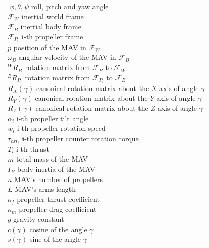 \begin{tabbing}
 \hspace*{1.6cm} \= \kill
  $\phi, \theta, \psi$    \> roll, pitch and yaw angle \\[0.5ex]
  $\mathcal{F}_{W}$   \> inertial world frame \\[0.5ex]
  $\mathcal{F}_{B}$   \> inertial body frame \\[0.5ex]
  $\mathcal{F}_{P_{i}}$   \> i-th propeller frame \\[0.5ex]
  $p$   \> position of the MAV in $\mathcal{F}_{W}$ \\[0.5ex]
  $\omega_{B}$    \> angular velocity of the MAV in $\mathcal{F}_{B}$\\[0.5ex]
  $^{W}R_{B}$   \> rotation matrix from $\mathcal{F}_{B}$ to $\mathcal{F}_{W}$\\[0.5ex]
  $^{B}R_{P_{i}}$  \> rotation matrix from $\mathcal{F}_{P_{i}}$ to $\mathcal{F}_{B}$\\[0.5ex]
  $R_{X}(\gamma)$   \> canonical rotation matrix about the $X$ axis of angle $\gamma$\\[0.5ex]
  $R_{Y}(\gamma)$   \> canonical rotation matrix about the $Y$ axis of angle $\gamma$\\[0.5ex]
  $R_{Z}(\gamma)$   \> canonical rotation matrix about the $Z$ axis of angle $\gamma$\\[0.5ex]
  $\alpha_{i}$    \> i-th propeller tilt angle\\[0.5ex]
  $w_{i}$    \> i-th propeller rotation speed\\[0.5ex]
  $\tau_{ext_{i}}$    \> i-th propeller counter rotation torque\\[0.5ex]
  $T_{i}$    \> i-th thrust\\[0.5ex]
  $m$    \> total mass of the MAV\\[0.5ex]
  $I_{B}$    \> body inertia of the MAV\\[0.5ex]
  $n$    \> MAV's number of propellers\\[0.5ex]
  $L$    \> MAV's arms length\\[0.5ex]
  $\kappa_{f}$    \> propeller thrust coefficient\\[0.5ex]
  $\kappa_{m}$    \> propeller drag coefficient\\[0.5ex]
  $g$    \> gravity constant\\[0.5ex]
  $c(\gamma)$   \> cosine of the angle $\gamma$\\[0.5ex]
  $s(\gamma)$   \> sine of the angle $\gamma$\\[0.5ex]
\end{tabbing}

